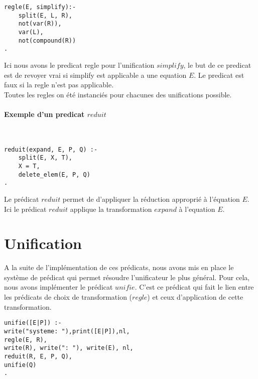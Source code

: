 \documentclass[10pt,a4paper]{report}
\begin{document}
\begin{lstlisting}[caption ={Choix de la regle $simplify$}]
regle(E, simplify):-
	split(E, L, R),
	not(var(R)),
	var(L),
	not(compound(R))
.
\end{lstlisting}
Ici nous avons le predicat regle pour l'unification $simplify$, le but de ce predicat est de revoyer vrai si simplify est applicable a une equation $E$. Le predicat est faux si la regle n'est pas applicable. \\
Toutes les regles on été instanciés pour chacunes des unifications possible.


\paragraph{Exemple d'un predicat $reduit$} ~\\

\begin{lstlisting}[caption ={Application de la reduction $expand$}]
reduit(expand, E, P, Q) :-
	split(E, X, T),
	X = T,
	delete_elem(E, P, Q)
.
\end{lstlisting}
Le prédicat $reduit$ permet de d'appliquer la réduction approprié à l'équation $E$. Ici le prédicat $reduit$ applique la transformation $expand$ à l'equation $E$. 

\section*{Unification}
A la suite de l'implémentation de ces prédicats, nous avons mis en place le système de prédicat qui permet résoudre l'unificateur le plus général. Pour cela, nous avons implémenter le prédicat $unifie$. C'est ce prédicat qui fait le lien entre les prédicats de choix de transformation ($regle$) et ceux d'application de cette transformation.

\begin{lstlisting}[caption ={Prédicat d'unification d'un système d'équation}]
unifie([E|P]) :-
write("systeme: "),print([E|P]),nl,
regle(E, R),
write(R), write(": "), write(E), nl,
reduit(R, E, P, Q),
unifie(Q)
.
\end{lstlisting}
\end{document}
